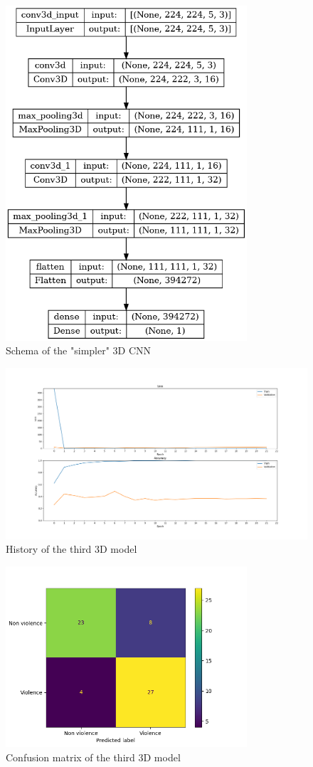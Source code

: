 \begin{figure}[]
    \centering
    \includegraphics[width=0.8\textwidth, height=0.6\textwidth, keepaspectratio]{images/3D9CNNschema.png}
    \caption{Schema of the "simpler" 3D CNN}
    \label{fig:3D3CNNschema}
\end{figure}

\begin{figure}[]
    \centering
    \includegraphics[width=\textwidth]{images/7f2d-testGiacomo3D3-9fcf-history.png}
    \caption{History of the third 3D model}
    \label{fig:Third3DCNNHistory}
\end{figure}

\begin{figure}[]
    \centering
    \includegraphics[width=0.8\textwidth]{images/71d5-testGiacomo3D3-9fcf-conf_matrix.png}
    \caption{Confusion matrix of the third 3D model}
    \label{fig:Third3DCNNconfusionMatrix}
\end{figure}



